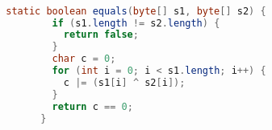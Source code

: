\begin{lstlisting}[language=java]

        static boolean equals(byte[] s1, byte[] s2) {
                if (s1.length != s2.length) {
                  return false;
                }
                char c = 0;
                for (int i = 0; i < s1.length; i++) {
                  c |= (s1[i] ^ s2[i]);
                }
                return c == 0;
              }
        
\end{lstlisting}













































